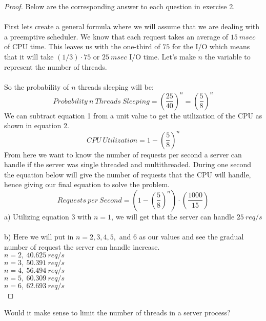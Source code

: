 \documentclass[12pt]{article}
\newenvironment{exercise}[2][Exercise]{\begin{trivlist}
\item[\hskip \labelsep {\bfseries #1}\hskip \labelsep {\bfseries #2.}]}{\end{trivlist}}
\begin{document}
\begin{proof}
Below are the corresponding answer to each question in exercise 2. \\ \\
First lets create a general formula where we will assume that we are dealing with a preemptive scheduler. We know that each request takes an average of $15 \ msec$ of CPU time. This leaves us with the one-third of $75$ for the I/O which means that it will take $(1/3) \cdot 75$ or $25 \ msec$ I/O time. Let's make $n$ the variable to represent the number of threads. \\ \\
So the probability of $n$ threads sleeping will be:
\begin{equation}\label{1}
Probability \ n \ Threads \ Sleeping = \left(\dfrac{25}{40}\right)^{n} = \left(\dfrac{5}{8}\right)^{n}
\end{equation}
We can subtract equation 1 from a unit value to get the utilization of the CPU as shown in equation 2. 
\begin{equation}\label{2}
CPU \ Utilization = 1-\left(\dfrac{5}{8}\right)^{n}
\end{equation}
From here we want to know the number of requests per second a server can handle if the server was single threaded and multithreaded. During one second the equation below will give the number of requests that the CPU will handle, hence giving our final equation to solve the problem.
\begin{equation}\label{3}
Requests \ per \ Second = \left(1-\left(\dfrac{5}{8}\right)^{n}\right) \cdot \left(\dfrac{1000}{15}\right)
\end{equation}
a) Utilizing equation 3 with $n=1$, we will get that the server can handle $25 \ req/s$ \\ \\
b) Here we will put in $n=2,3,4,5,$ and $6$ as our values and see the gradual number of request the server can handle increase. \\
$n=2, \ 40.625 \ req/s$ \\
$n=3, \ 50.391 \ req/s$ \\
$n=4, \ 56.494 \ req/s$ \\
$n=5, \ 60.309 \ req/s$ \\
$n=6, \ 62.693 \ req/s$ \\
\end{proof}

\begin{exercise}{3}
Would it make sense to limit the number of threads in a server process?
\end{exercise}
\end{document}
